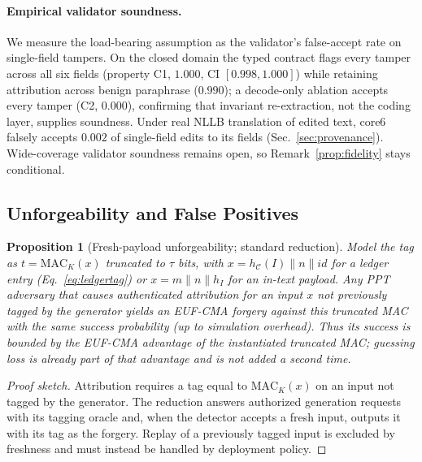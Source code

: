 \documentclass[11pt]{article}
\newtheorem{proposition}{Proposition}
\begin{document}
\paragraph{Empirical validator soundness.}
We measure the load-bearing assumption as the validator's false-accept rate on single-field tampers. On the closed domain the typed contract flags every tamper across all six fields (property C1, $1.000$, CI $[0.998,1.000]$) while retaining attribution across benign paraphrase ($0.990$); a decode-only ablation accepts every tamper (C2, $0.000$), confirming that invariant re-extraction, not the coding layer, supplies soundness. Under real NLLB translation of edited text, core6 falsely accepts $0.002$ of single-field edits to its fields (Sec.~\ref{sec:provenance}). Wide-coverage validator soundness remains open, so Remark~\ref{prop:fidelity} stays conditional.

\subsection{Unforgeability and False Positives}
\begin{proposition}[Fresh-payload unforgeability; standard reduction]
\label{thm:unforge}
Model the tag as $t=\mathrm{MAC}_K(x)$ truncated to $\tau$ bits, with $x=h_{\mathcal{C}}(I)\parallel n\parallel\mathit{id}$ for a ledger entry (Eq.~\eqref{eq:ledgertag}) or $x=m\parallel n\parallel h_I$ for an in-text payload. Any PPT adversary that causes authenticated attribution for an input $x$ not previously tagged by the generator yields an EUF-CMA forgery against this truncated MAC with the same success probability (up to simulation overhead). Thus its success is bounded by the EUF-CMA advantage of the instantiated truncated MAC; guessing loss is already part of that advantage and is not added a second time.
\end{proposition}
\begin{proof}[Proof sketch]
Attribution requires a tag equal to $\mathrm{MAC}_K(x)$ on an input not tagged by the generator. The reduction answers authorized generation requests with its tagging oracle and, when the detector accepts a fresh input, outputs it with its tag as the forgery. Replay of a previously tagged input is excluded by freshness and must instead be handled by deployment policy.
\end{proof}
\end{document}
